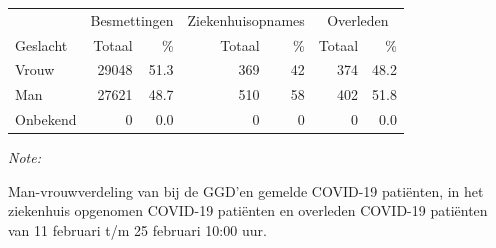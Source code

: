 \documentclass[
  english,
  man,floatsintext]{apa6}
\begin{document}
\begin{table}[H]
\centering\begingroup\fontsize{11}{13}\selectfont

\begin{threeparttable}
\begin{tabular}{lrrrrrr}
\toprule
\multicolumn{1}{c}{ } & \multicolumn{2}{c}{Besmettingen} & \multicolumn{2}{c}{Ziekenhuisopnames} & \multicolumn{2}{c}{Overleden} \\
\cmidrule(l{3pt}r{3pt}){2-3} \cmidrule(l{3pt}r{3pt}){4-5} \cmidrule(l{3pt}r{3pt}){6-7}
Geslacht & Totaal & \% & Totaal & \% & Totaal & \%\\
\midrule
Vrouw & 29048 & 51.3 & 369 & 42 & 374 & 48.2\\
Man & 27621 & 48.7 & 510 & 58 & 402 & 51.8\\
Onbekend & 0 & 0.0 & 0 & 0 & 0 & 0.0\\
\bottomrule
\end{tabular}
\begin{tablenotes}
\item \textit{Note: } 
\item Man-vrouwverdeling van bij de GGD’en gemelde COVID-19 patiënten, in het ziekenhuis opgenomen COVID-19 patiënten en overleden COVID-19 patiënten van 11 februari t/m 25 februari 10:00 uur.
\end{tablenotes}
\end{threeparttable}
\endgroup{}
\end{table}
\newpage
\end{document}
